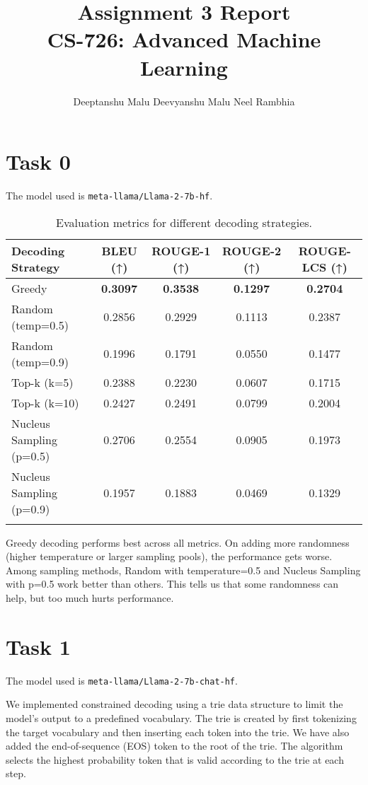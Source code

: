 \documentclass[11pt]{article}
\title{Assignment 3 Report\\
    CS-726: Advanced Machine Learning}
\author{Deeptanshu Malu \quad Deevyanshu Malu \quad Neel Rambhia}
\date{}
\begin{document}
\maketitle

\section{Task 0}

The model used is \texttt{meta-llama/Llama-2-7b-hf}.

\begin{longtable}{|l|c|c|c|c|}
    \hline
    \textbf{Decoding Strategy} & \textbf{BLEU} (↑) & \textbf{ROUGE-1} (↑) & \textbf{ROUGE-2} (↑) & \textbf{ROUGE-LCS} (↑) \\
    \hline
    Greedy & \textbf{0.3097} & \textbf{0.3538} & \textbf{0.1297} & \textbf{0.2704} \\
    \hline
    Random (temp=0.5) & 0.2856 & 0.2929 & 0.1113 & 0.2387 \\
    \hline
    Random (temp=0.9) & 0.1996 & 0.1791 & 0.0550 & 0.1477 \\
    \hline
    Top-k (k=5) & 0.2388 & 0.2230 & 0.0607 & 0.1715 \\
    \hline
    Top-k (k=10) & 0.2427 & 0.2491 & 0.0799 & 0.2004 \\
    \hline
    Nucleus Sampling (p=0.5) & 0.2706 & 0.2554 & 0.0905 & 0.1973 \\
    \hline
    Nucleus Sampling (p=0.9) & 0.1957 & 0.1883 & 0.0469 & 0.1329 \\
    \hline
    \caption{Evaluation metrics for different decoding strategies.}
\end{longtable}

Greedy decoding performs best across all metrics. On adding more randomness (higher temperature or larger sampling pools), the performance gets worse. Among sampling methods, Random with temperature=0.5 and Nucleus Sampling with p=0.5 work better than others. This tells us that some randomness can help, but too much hurts performance.

\section{Task 1}
The model used is \texttt{meta-llama/Llama-2-7b-chat-hf}.

We implemented constrained decoding using a trie data structure to limit the model's output to a predefined vocabulary. The trie is created by first tokenizing the target vocabulary and then inserting each token into the trie. We have also added the end-of-sequence (EOS) token to the root of the trie. The algorithm selects the highest probability token that is valid according to the trie at each step.
\end{document}
